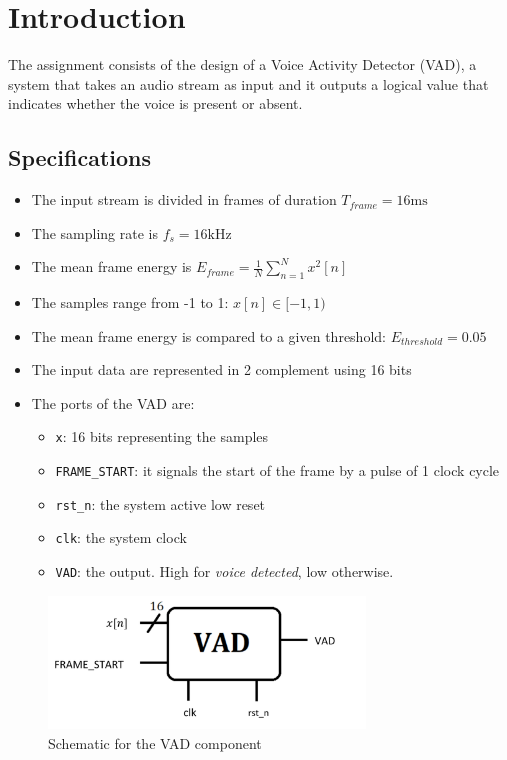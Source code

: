\section{Introduction}


The assignment consists of the design of a Voice Activity Detector (VAD), a
system that takes an audio stream as input and it outputs a logical value that
indicates whether the voice is present or absent.

\subsection{Specifications}
\begin{itemize}
  \item The input stream is divided in frames of duration
  $T_{frame} = 16\si{\milli\second}$
  \item The sampling rate is $f_s = 16 \si{\kilo\hertz}$
  \item The mean frame energy is $ E_{frame} = \frac{1}{N}\sum_{n=1}^N x^2[n] $
  \item The samples range from -1 to 1: $x[n] \in [-1, 1)$
  \item The mean frame energy is compared to a given threshold:
  $ E_{threshold} = 0.05 $
  \item The input data are represented in 2 complement using 16 bits
  \item The ports of the VAD are:
  \begin{itemize}
    \item \texttt{x}: 16 bits representing the samples
    \item \texttt{FRAME\_START}: it signals the start of the frame by
    a pulse of 1 clock cycle
    \item \texttt{rst\_n}: the system active low reset
    \item \texttt{clk}: the system clock
    \item \texttt{VAD}: the output. High for \textit{voice detected},
    low otherwise.
  \end{itemize}
\end{itemize}

\begin{figure}[]
  \centering
  \includegraphics[width=0.75\textwidth]{figs/vad_schematic.png}
  \caption{Schematic for the VAD component}
  \label{fig:schematic}
\end{figure}
